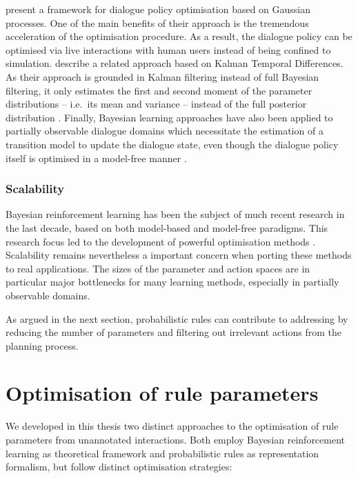 \cite{gasic2011} present a framework for dialogue policy optimisation based on Gaussian processes. One of the main benefits of their approach is the tremendous acceleration of the optimisation procedure.  As a result, the dialogue policy can be optimised via live interactions with human users instead of being confined to simulation. \cite{Supelec808} describe a related approach based on Kalman Temporal Differences.  As their approach is grounded in Kalman filtering instead of full Bayesian filtering, it only estimates the first and second moment of the parameter distributions -- i.e.\ its mean and variance -- instead of the full posterior distribution \citep{DBLP:journals/jair/GeistP10}. Finally, Bayesian learning approaches have also been applied to partially observable dialogue domains which necessitate the estimation of a transition model to update the dialogue state, even though the dialogue policy itself is optimised in a model-free manner \citep{DBLP:conf/slt/ThomsonJGKMYY10}. 


\subsubsection*{Scalability}

Bayesian reinforcement learning has been the subject of much recent research in the last decade, based on both model-based and model-free paradigms. This research focus led to the development of powerful optimisation methods \cite[see e.g.][for a detailed survey]{brl2012}. Scalability remains nevertheless a important concern when porting these methods to real applications.  The sizes of the parameter and action spaces are in particular major bottlenecks for many learning methods, especially in partially observable domains. 

As argued in the next section, probabilistic rules can contribute to addressing by reducing the number of parameters and filtering out irrelevant actions from the planning process.

\section{Optimisation of rule parameters}
\label{sec:rl-ruleparams}

We developed in this thesis two distinct approaches to the optimisation of rule parameters from unannotated interactions. Both employ Bayesian reinforcement learning as theoretical framework and probabilistic rules as representation formalism, but follow distinct optimisation strategies:

